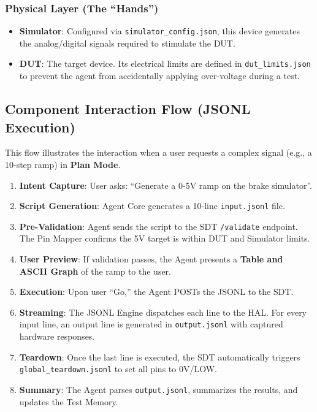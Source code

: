 \documentclass[conference]{IEEEtran}
\begin{document}
\subsubsection{Physical Layer (The ``Hands'')}
\begin{itemize}
    \item \textbf{Simulator}: Configured via \texttt{simulator\_config.json}, this device generates the analog/digital signals required to stimulate the DUT.
    \item \textbf{DUT}: The target device. Its electrical limits are defined in \texttt{dut\_limits.json} to prevent the agent from accidentally applying over-voltage during a test.
\end{itemize}

\subsection{Component Interaction Flow (JSONL Execution)}
This flow illustrates the interaction when a user requests a complex signal (e.g., a 10-step ramp) in \textbf{Plan Mode}.
\begin{enumerate}
    \item \textbf{Intent Capture}: User asks: ``Generate a 0-5V ramp on the brake simulator''.
    \item \textbf{Script Generation}: Agent Core generates a 10-line \texttt{input.jsonl} file.
    \item \textbf{Pre-Validation}: Agent sends the script to the SDT \texttt{/validate} endpoint. The Pin Mapper confirms the 5V target is within DUT and Simulator limits.
    \item \textbf{User Preview}: If validation passes, the Agent presents a \textbf{Table and ASCII Graph} of the ramp to the user.
    \item \textbf{Execution}: Upon user ``Go,'' the Agent POSTs the JSONL to the SDT.
    \item \textbf{Streaming}: The JSONL Engine dispatches each line to the HAL. For every input line, an output line is generated in \texttt{output.jsonl} with captured hardware responses.
    \item \textbf{Teardown}: Once the last line is executed, the SDT automatically triggers \texttt{global\_teardown.jsonl} to set all pins to 0V/LOW.
    \item \textbf{Summary}: The Agent parses \texttt{output.jsonl}, summarizes the results, and updates the Test Memory.
\end{enumerate}
\end{document}
